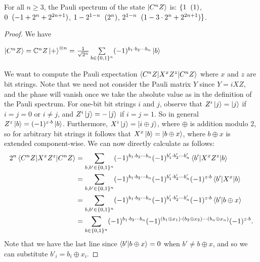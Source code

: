 \documentclass[12pt]{dalthesis}
\begin{document}
\begin{proposition}
\label{prop4.2}
For all $n \geq 3$, the Pauli spectrum of the state $\ket{C^n Z}$ is: $\{ 1 \hspace{2mm} (1)$, $0 \hspace{2mm} (-1 +2^{n} + 2^{2n+1})$, $1-2^{1-n} \hspace{2mm} (2^n)$, $2^{1-n}  \hspace{2mm} (1-3 \cdot 2^{n} + 2^{2n+1}) \}$.
\end{proposition}

\begin{proof}
We have 
\begin{center}
$\ket{C^n Z} = \mathbb{C}^n Z \ket{+}^{\otimes n} = \frac{1}{\sqrt{2^n}} \sum\limits_{b \in \{0, 1\}^n} (-1)^{b_1 \cdot b_2 \cdots b_n} \ket{b}$
\end{center}
We want to compute the Pauli expectation $\braket{C^n Z|X^xZ^z|C^n Z}$ where $x$ and $z$ are bit strings. Note that we need not consider the Pauli matrix $Y$ since $Y = iXZ$, and the phase will vanish once we take the absolute value as in the definition of the Pauli spectrum. For one-bit bit strings $i$ and $j$, observe that $Z^i \ket{j} = \ket{j}$ if $i=j=0$ or $i \neq j$, and $Z^i \ket{j} = -\ket{j}$ if $i=j=1$. So in general $Z^z \ket{b} = (-1)^{z \cdot b}\ket{b}$. Furthermore, $X^i \ket{j} = \ket{i \oplus j}$, where $\oplus$ is addition modulo 2, so for arbitrary bit strings it follows that $X^x\ket{b} = \ket{b \oplus x}$, where $b \oplus x$ is extended component-wise. We can now directly calculate as follows:
\begin{equation*}
\begin{split}
2^n\braket{C^n Z|X^xZ^z|C^n Z} & = \sum\limits_{b, b' \in \{0, 1\}^n} (-1)^{b_1 \cdot b_2 \cdots b_n} (-1)^{b'_1 \cdot b'_2 \cdots b'_n} \braket{b'|X^xZ^z|b} \\
& = \sum\limits_{b, b' \in \{0, 1\}^n} (-1)^{b_1 \cdot b_2 \cdots b_n} (-1)^{b'_1 \cdot b'_2 \cdots b'_n} (-1)^{z \cdot b} \braket{b'|X^x|b} \\
& = \sum\limits_{b, b' \in \{0, 1\}^n} (-1)^{b_1 \cdot b_2 \cdots b_n} (-1)^{b'_1 \cdot b'_2 \cdots b'_n} (-1)^{z \cdot b} \braket{b'|b \oplus x} \\
& = \sum\limits_{b \in \{0, 1\}^n} (-1)^{b_1 \cdot b_2 \cdots b_n} (-1)^{(b_1 \oplus x_1) \cdot (b_2 \oplus x_2) \cdots (b_n \oplus x_n)} (-1)^{z \cdot b}.
\end{split}
\end{equation*}
Note that we have the last line since $\braket{b'|b \oplus x} = 0$ when $b' \neq b \oplus x$, and so we can substitute $b'_i = b_i \oplus x_i$. 


\end{proof}
\end{document}
